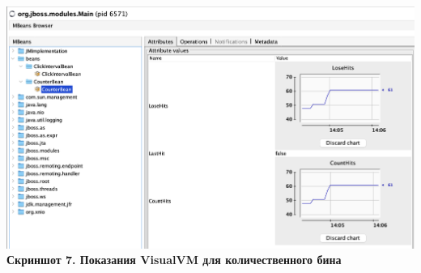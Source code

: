 \documentclass{article}
\begin{document}
\begin{center}
    \includegraphics[width=.9\textwidth]{countBB.png}\\
    \textbf{Скриншот 7. Показания VisualVM для количественного бина}
\end{center}
\end{document}
